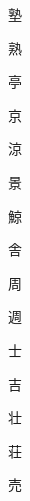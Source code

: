 \begin{spacing}{2.5}
{\Huge \begin{CJK}{UTF8}{min} 塾\end{CJK}}\hspace{0.1cm}
{\Huge \begin{CJK}{UTF8}{min} 熟\end{CJK}}\hspace{0.1cm}
{\Huge \begin{CJK}{UTF8}{min} 亭\end{CJK}}\hspace{0.1cm}
{\Huge \begin{CJK}{UTF8}{min} 京\end{CJK}}\hspace{0.1cm}
{\Huge \begin{CJK}{UTF8}{min} 涼\end{CJK}}\hspace{0.1cm}
{\Huge \begin{CJK}{UTF8}{min} 景\end{CJK}}\hspace{0.1cm}
{\Huge \begin{CJK}{UTF8}{min} 鯨\end{CJK}}\hspace{0.1cm}
{\Huge \begin{CJK}{UTF8}{min} 舎\end{CJK}}\hspace{0.1cm}
{\Huge \begin{CJK}{UTF8}{min} 周\end{CJK}}\hspace{0.1cm}
{\Huge \begin{CJK}{UTF8}{min} 週\end{CJK}}\hspace{0.1cm}
{\Huge \begin{CJK}{UTF8}{min} 士\end{CJK}}\hspace{0.1cm}
{\Huge \begin{CJK}{UTF8}{min} 吉\end{CJK}}\hspace{0.1cm}
{\Huge \begin{CJK}{UTF8}{min} 壮\end{CJK}}\hspace{0.1cm}
{\Huge \begin{CJK}{UTF8}{min} 荘\end{CJK}}\hspace{0.1cm}
{\Huge \begin{CJK}{UTF8}{min} 売\end{CJK}}\hspace{0.1cm}

\end{spacing}

